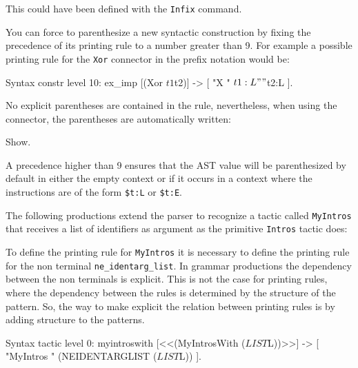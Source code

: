 This could have been defined with the {\tt Infix} command.



You can force to parenthesize a new syntactic construction by fixing
the precedence of its printing rule to a number greater than 9. For
example a possible printing rule for the {\tt Xor} connector in the prefix
notation would be:

\begin{coq_example*}
Syntax constr level 10:
  ex_imp [(Xor $t1  $t2)] -> [ "X " $t1:L " " $t2:L ].
\end{coq_example*}

No explicit parentheses are contained in the rule, nevertheless, when
using the connector, the parentheses are automatically written:

\begin{coq_example}
Show.
\end{coq_example}

A precedence higher than 9 ensures that the AST value will be
parenthesized by default in either the empty context or if it occurs
in a context where the instructions are of the form
\verb+$t:L+ or \verb+$t:E+.



The following productions extend the parser to recognize a
tactic called \verb+MyIntros+ that receives a list of identifiers as
argument as the primitive \verb+Intros+ tactic does:


To define the printing rule for \verb+MyIntros+ it is necessary to
define the printing rule for the non terminal \verb+ne_identarg_list+.
In grammar productions the dependency between the non terminals is
explicit. This is not the case for printing rules, where the
dependency between the rules is determined by the structure of the
pattern. So, the way to make explicit the relation between printing
rules is by adding structure to the patterns.

\begin{coq_example}
Syntax tactic level 0:
  myintroswith [<<(MyIntrosWith ($LIST $L))>>] ->
   [ "MyIntros " (NEIDENTARGLIST ($LIST $L)) ].
\end{coq_example}

